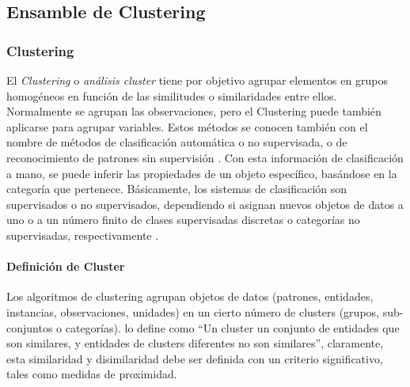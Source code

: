 \subsection{Ensamble de Clustering}
\subsubsection{Clustering}
El \textit{Clustering} o \textit{análisis cluster} tiene por objetivo agrupar elementos en grupos homogéneos en función de las similitudes o similaridades entre ellos. Normalmente se agrupan las observaciones, pero el Clustering puede también aplicarse para agrupar variables. Estos métodos se conocen también con el nombre de métodos de clasificación automática o no supervisada, o de reconocimiento de patrones sin supervisión \citep{pena2013analisis}. Con esta información de clasificación a mano, se puede inferir las propiedades de un objeto específico, basándose en la categoría que pertenece. Básicamente, los sistemas de clasificación son supervisados o no supervisados, dependiendo si asignan nuevos objetos de datos a uno o a un número finito de clases supervisadas discretas o categorías no supervisadas, respectivamente \citep{xu2008clustering}.

\paragraph{Definición de Cluster}
Los algoritmos de clustering agrupan objetos de datos (patrones, entidades, instancias, observaciones, unidades) en un cierto número de clusters (grupos, sub-conjuntos o categorías).
\cite{everittcluster} lo define como “Un cluster un conjunto de entidades que son similares, y entidades de clusters diferentes no son similares”, claramente, esta similaridad y disimilaridad debe ser definida con un criterio significativo, tales como medidas de proximidad.

